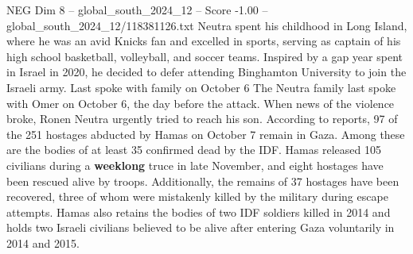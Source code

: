 \begin{textsample}{NEG Dim 8 – global\_south\_2024\_12 – Score -1.00 – global\_south\_2024\_12/118381126.txt}
Neutra spent his childhood in Long Island, where he was an avid Knicks fan and excelled in sports, serving as captain of his high school basketball, volleyball, and soccer teams.
Inspired by a gap year spent in Israel in 2020, he decided to defer attending Binghamton University to join the Israeli army.
Last spoke with family on October 6 The Neutra family last spoke with Omer on October 6, the day before the attack.
When news of the violence broke, Ronen Neutra urgently tried to reach his son.
According to reports, 97 of the 251 hostages abducted by Hamas on October 7 remain in Gaza.
Among these are the bodies of at least 35 confirmed dead by the IDF.
Hamas released 105 civilians during a \textbf{weeklong} truce in late November, and eight hostages have been rescued alive by troops.
Additionally, the remains of 37 hostages have been recovered, three of whom were mistakenly killed by the military during escape attempts.
Hamas also retains the bodies of two IDF soldiers killed in 2014 and holds two Israeli civilians believed to be alive after entering Gaza voluntarily in 2014 and 2015.

\end{textsample}
